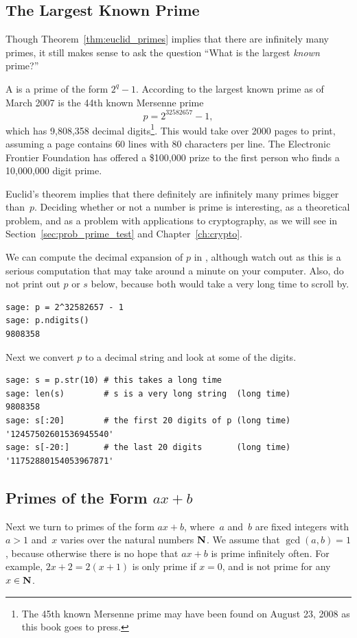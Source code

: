 \subsection{The Largest Known Prime}\label{sec:largest}
Though Theorem~\ref{thm:euclid_primes} implies that there are infinitely
many primes, it still makes sense to ask the question
``What is the largest {\em known} prime?''

A  is a prime of the form $2^q-1$.
According to \cite{caldwell:largestprime} the largest known prime
as of March 2007 is the 44th known Mersenne prime
$$
  p = 2^{32582657}-1,
$$
which has 9,808,358 decimal
digits\footnote{The 45th known Mersenne prime may
have been found on August 23, 2008 as this book goes to press.}.
This would take over 2000 pages to
print, assuming a page contains 60 lines with 80 characters per line.
The Electronic Frontier Foundation has offered a \$100,000 prize to
the first person who finds a 10,000,000 digit prime.

Euclid's theorem implies that there definitely are infinitely
many primes bigger than~$p$.
Deciding whether or not a number is prime is
interesting, as a theoretical problem,
and as a problem with
applications to cryptography, as we will see in
Section~\ref{sec:prob_prime_test} and Chapter~\ref{ch:crypto}.

\begin{sg}
We can compute the decimal expansion of $p$ in \sage, although
watch out as this is a serious computation that may take
around a minute on your computer.  Also, do not print
out $p$ or $s$ below, because both would take a very
long time to  scroll by.
\begin{verbatim}
sage: p = 2^32582657 - 1
sage: p.ndigits()
9808358
\end{verbatim}%
\noindent{}Next we convert $p$ to a decimal string and look at some of the digits.
\begin{verbatim}
sage: s = p.str(10) # this takes a long time
sage: len(s)        # s is a very long string  (long time)
9808358
sage: s[:20]        # the first 20 digits of p (long time)
'12457502601536945540'
sage: s[-20:]       # the last 20 digits       (long time)
'11752880154053967871'
\end{verbatim}
\end{sg}


\subsection{Primes of the Form $ax+b$}
Next we turn to primes of the form $ax+b$, where~$a$ and~$b$ are
fixed integers with $a>1$ and~$x$ varies over the natural numbers $\mathbf{N}$.
We assume that $\gcd(a,b)=1$, because otherwise there is no
hope that $ax+b$ is prime infinitely often.
For example, $2x+2=2(x+1)$ is only prime if $x=0$, and is
not prime for any $x\in\mathbf{N}$.

